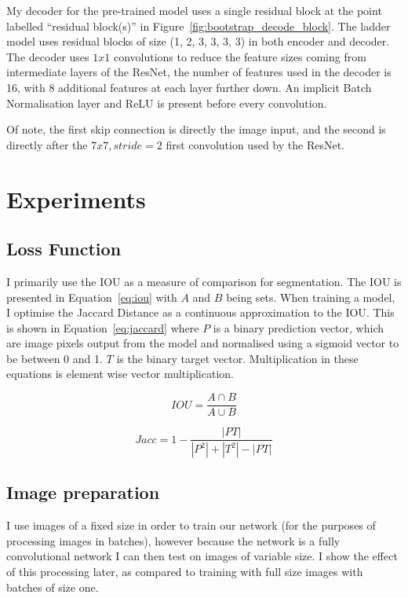 My decoder for the pre-trained model uses a single residual block at the point labelled ``residual block(s)'' in Figure~\ref{fig:bootstrap_decode_block}. The ladder model uses residual blocks of size (1, 2, 3, 3, 3, 3) in both encoder and decoder. The decoder uses $ 1x1 $ convolutions to reduce the feature sizes coming from intermediate layers of the ResNet, the number of features used in the decoder is 16, with 8 additional features at each layer further down. An implicit Batch Normalisation layer and ReLU is present before every convolution.

Of note, the first skip connection is directly the image input, and the second is directly after the $7x7, stride=2$ first convolution used by the ResNet.


\section {Experiments}


\subsection {Loss Function}


I primarily use the \gls{IOU} as a measure of comparison for segmentation. The \gls{IOU} is presented in Equation~\ref{eq:iou} with $ A $ and $ B $ being sets. When training a model, I optimise the Jaccard Distance as a continuous approximation to the \gls{IOU}. This is shown in Equation~\ref{eq:jaccard} where $ P $ is a binary prediction vector, which are image pixels output from the model and normalised using a sigmoid vector to be between 0 and 1. $ T $ is the binary target vector. Multiplication in these equations is element wise vector multiplication.


\begin{equation}
IOU = \frac{A \cap B}{A \cup B}
\label{eq:iou}
\end{equation}


\begin{equation}
Jacc = 1 - \frac{| PT |}{| P^2 | + | T^2 | - | PT |}
\label{eq:jaccard}
\end{equation}



\subsection {Image preparation}

I use images of a fixed size in order to train our network (for the purposes of processing images in batches), however because the network is a fully convolutional network I can then test on images of variable size. I show the effect of this processing later, as compared to training with full size images with batches of size one.

